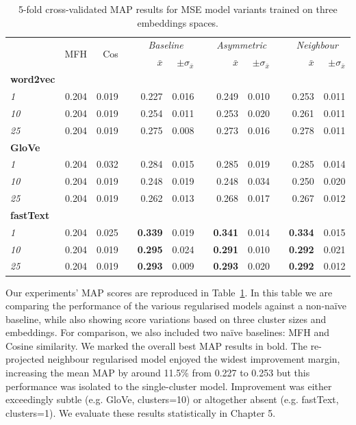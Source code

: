 \begin{table}\centering
\begin{tabular}{@{}lrrcrrcrrcrr@{}}\toprule
& \multirow{2}{*}{MFH} & \multirow{2}{*}{Cos} & \phantom{a} &  \multicolumn{2}{c}{\textit{Baseline}} & \phantom{a} & \multicolumn{2}{c}{\textit{Asymmetric}} & \phantom{a} & \multicolumn{2}{c}{\textit{Neighbour}}\\
\cmidrule{5-6} \cmidrule{8-9} \cmidrule{11-12}
&  &  && $\bar{x}$ & $\pm\sigma_{\bar{x}}$ && $\bar{x}$ & $\pm\sigma_{\bar{x}}$ && $\bar{x}$ & $\pm\sigma_{\bar{x}}$ \\ \midrule
\textbf{word2vec}\\
\textit{1} & 0.204 & 0.019 && 0.227 & 0.016 && 0.249 & 0.010 && 0.253 & 0.011 \\
\textit{10} & 0.204 & 0.019 && 0.254 & 0.011 && 0.253 & 0.020 && 0.261 & 0.011 \\
\textit{25} & 0.204 & 0.019 && 0.275 & 0.008 && 0.273 & 0.016 && 0.278 & 0.011 \\
\cmidrule{2-12}
\textbf{GloVe}\\
\textit{1} & 0.204 & 0.032 && 0.284 & 0.015 && 0.285 & 0.019 && 0.285 & 0.014 \\
\textit{10} & 0.204 & 0.019 && 0.248 & 0.019 && 0.248 & 0.034 && 0.250 & 0.020 \\
\textit{25} & 0.204 & 0.019 && 0.262 & 0.013 && 0.268 & 0.017 && 0.267 & 0.012 \\
\cmidrule{2-12}
\textbf{fastText}\\
\textit{1} & 0.204 & 0.025 && \textbf{0.339} & 0.019 && \textbf{0.341} & 0.014 && \textbf{0.334} & 0.015 \\
\textit{10} & 0.204 & 0.019 && \textbf{0.295} & 0.024 && \textbf{0.291} & 0.010 && \textbf{0.292} & 0.021 \\
\textit{25} & 0.204 & 0.019 && \textbf{0.293} & 0.009 && \textbf{0.293} & 0.020 && \textbf{0.292} & 0.012 \\
\bottomrule
\end{tabular}
\caption{5-fold cross-validated \ac{MAP} results for \ac{MSE} model variants trained on three embeddings spaces.}\label{tab:map_mse}
\end{table}
Our experiments' \ac{MAP} scores are reproduced in Table~\ref{tab:map_mse}.  In this table we are comparing the performance of the various regularised models against a non-na\"ive baseline, while also showing score variations based on three cluster sizes and embeddings.  For comparison, we also included two na\"ive baselines: MFH and Cosine similarity.  We marked the overall best \ac{MAP} results in bold.  The re-projected neighbour regularised model enjoyed the widest improvement margin, increasing the mean \ac{MAP} by around 11.5\% from 0.227 to 0.253 but this performance was isolated to the single-cluster model.  Improvement was either exceedingly subtle (e.g. GloVe, clusters=10) or altogether absent (e.g. fastText, clusters=1).  We evaluate these results statistically in Chapter 5.

